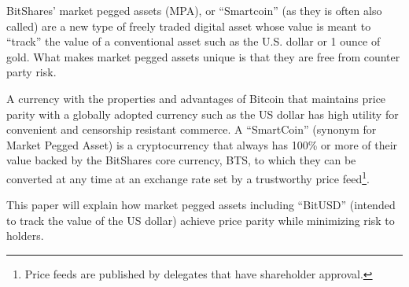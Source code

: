 BitShares' market pegged assets (MPA), or ``Smartcoin'' (as they is often also
called) are a new type of freely traded digital asset whose value is meant to
``track'' the value of a conventional asset such as the U.S. dollar or 1 ounce
of gold. What makes market pegged assets unique is that they are free from
counter party risk.

A currency with the properties and advantages of Bitcoin that maintains price
parity with a globally adopted currency such as the US dollar has high utility
for convenient and censorship resistant commerce. A ``SmartCoin'' (synonym for
Market Pegged Asset) is a cryptocurrency that always has 100\% or more of
their value backed by the BitShares core currency, BTS, to which they can be
converted at any time at an exchange rate set by a trustworthy price
feed\footnote{Price feeds are published by delegates that have shareholder
approval.}. 
 
This paper will explain how market pegged assets including ``BitUSD'' (intended
to track the value of the US dollar) achieve price parity while minimizing risk
to holders.
